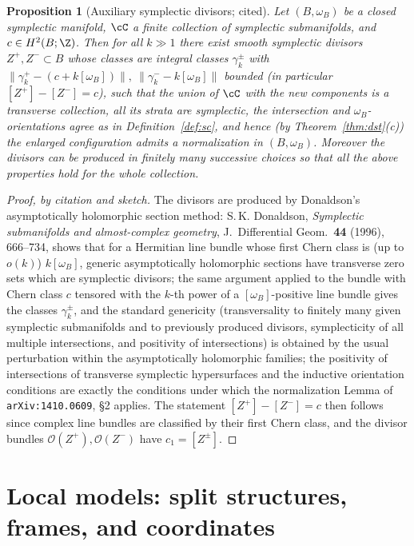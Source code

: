 \documentclass[11pt]{amsart}
\theoremstyle{plain}
\newtheorem{proposition}[theorem]{Proposition}
\theoremstyle{definition}
\newcommand{\cO}{\mathcal{O}}
\begin{document}
\begin{proposition}[Auxiliary symplectic divisors; cited]\label{prop:don}
Let $(B,\omega_B)$ be a closed symplectic manifold, $\cC$ a finite collection
of symplectic submanifolds, and $c\in H^2(B;\Z)$. Then for all $k\gg1$ there
exist smooth symplectic divisors $Z^+,Z^-\subset B$ whose classes are integral
classes $\gamma^\pm_k$ with
$\bigl\|\gamma^+_k-(c+k[\omega_B])\bigr\|,\ \bigl\|\gamma^-_k-k[\omega_B]\bigr\|$
bounded (in particular $[Z^+]-[Z^-]=c$), such that the union of
$\cC$ with the new components is a transverse collection, all its strata are
symplectic, the intersection and $\omega_B$-orientations agree as in
Definition~\ref{def:sc}, and hence (by Theorem~\ref{thm:dst}(c)) the enlarged
configuration admits a normalization in $(B,\omega_B)$. Moreover the divisors
can be produced in finitely many successive choices so that all the above
properties hold for the whole collection.
\end{proposition}

\begin{proof}[Proof, by citation and sketch]
The divisors are produced by Donaldson's asymptotically holomorphic section
method: S.\,K. Donaldson, \emph{Symplectic submanifolds and almost-complex
geometry}, J.\ Differential Geom.\ \textbf{44} (1996), 666--734, shows that
for a Hermitian line bundle whose first Chern class is (up to $o(k)$)
$k[\omega_B]$, generic asymptotically holomorphic sections have transverse
zero sets which are symplectic divisors; the same argument applied to the
bundle with Chern class $c$ tensored with the $k$-th power of a
$[\omega_B]$-positive line bundle gives the classes $\gamma^\pm_k$, and the
standard genericity (transversality to finitely many given symplectic
submanifolds and to previously produced divisors, symplecticity of all
multiple intersections, and positivity of intersections) is obtained by the
usual perturbation within the asymptotically holomorphic families; the
positivity of intersections of transverse symplectic hypersurfaces and the
inductive orientation conditions are exactly the conditions under which the
normalization Lemma of \texttt{arXiv:1410.0609}, \S2 applies. The statement
$[Z^+]-[Z^-]=c$ then follows since complex line bundles are classified by
their first Chern class, and the divisor bundles
$\cO(Z^+),\cO(Z^-)$ have $c_1=[Z^\pm]$.
\end{proof}

\section{Local models: split structures, frames, and coordinates}\label{sec:local}
\end{document}
